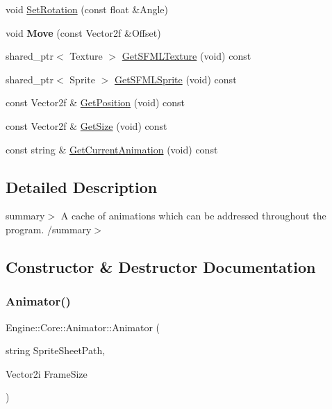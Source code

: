 \begin{DoxyCompactItemize}
\item 
void \hyperlink{class_engine_1_1_core_1_1_animator_a5071cebf52c5e8e5f2dbebaa1b9621fd}{Set\+Rotation} (const float \&Angle)
\item 
\mbox{\label{class_engine_1_1_core_1_1_animator_aea6291cbe191c4b9909002f3840f5299}} 
void {\bfseries Move} (const Vector2f \&Offset)
\item 
shared\+\_\+ptr$<$ Texture $>$ \hyperlink{class_engine_1_1_core_1_1_animator_a6a87289d258c863d02a3bee22074e92f}{Get\+S\+F\+M\+L\+Texture} (void) const
\item 
shared\+\_\+ptr$<$ Sprite $>$ \hyperlink{class_engine_1_1_core_1_1_animator_a50aef70515ac26985da30be5fc5247a1}{Get\+S\+F\+M\+L\+Sprite} (void) const
\item 
const Vector2f \& \hyperlink{class_engine_1_1_core_1_1_animator_adfbba33a29a643ed447ca292705e4e00}{Get\+Position} (void) const
\item 
const Vector2f \& \hyperlink{class_engine_1_1_core_1_1_animator_a1d8675cde73dfe307d11bde8ffccf78c}{Get\+Size} (void) const
\item 
const string \& \hyperlink{class_engine_1_1_core_1_1_animator_a107b26ce06d5429db241cb6fe8ddef44}{Get\+Current\+Animation} (void) const
\end{DoxyCompactItemize}


\subsection{Detailed Description}
summary$>$ A cache of animations which can be addressed throughout the program. /summary$>$ 

\subsection{Constructor \& Destructor Documentation}
\mbox{\label{class_engine_1_1_core_1_1_animator_aff070abc3b379dad575e88484b077dc1}} 
\subsubsection{\texorpdfstring{Animator()}{Animator()}}
{\footnotesize\ttfamily Engine\+::\+Core\+::\+Animator\+::\+Animator (\begin{DoxyParamCaption}\item[{string}]{Sprite\+Sheet\+Path,  }\item[{Vector2i}]{Frame\+Size }\end{DoxyParamCaption})}

